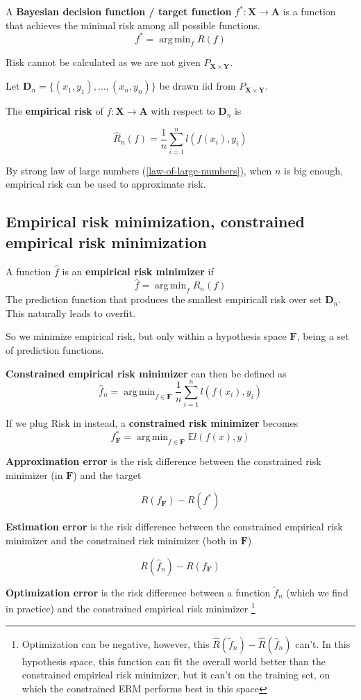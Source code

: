 \documentclass{article}
\DeclareMathOperator*{\argmin}{arg\,min}
\begin{document}
A \textbf{Bayesian decision function / target function} $f^* : \mathbf{X} \to \mathbf{A}$ is a function that achieves the minimal risk among all possible functions.
$$
f^* = \argmin_{f}{R(f)}
$$

Risk cannot be calculated as we are not given $P_{\mathbf{X} \times \mathbf{Y}}$.

Let $\mathbf{D}_n = \{(x_1, y_1), \dots, (x_n, y_n)\}$ be drawn iid from $P_{\mathbf{X} \times \mathbf{Y}}$.

The \textbf{empirical risk} of $f : \mathbf{X} \to \mathbf{A}$ with respect to $\mathbf{D}_n$ is

$$
\hat{R}_n(f) = \frac{1}{n} \sum_{i = 1}^{n}{\mathit{l}(f(x_i), y_i)}
$$

By strong law of large numbers (\ref{law-of-large-numbers}), when $n$ is big enough, empirical risk can be used to approximate risk.

\subsection{Empirical risk minimization, constrained empirical risk minimization}

A function $\hat{f}$ is an \textbf{empirical risk minimizer} if
$$
\hat{f} = \argmin_{f}{\hat{R}_n(f)}
$$
The prediction function that produces the smallest empiricall risk over set $\mathbf{D}_n$.
This naturally leads to overfit.

So we minimize empirical risk, but only within a hypothesis space $\mathbf{F}$, being a set of prediction functions.

\textbf{Constrained empirical risk minimizer} can then be defined as
$$
\hat{f}_n = \argmin_{f \in \mathbf{F}}{\frac{1}{n} \sum_{i = 1}^{n}{\mathit{l}(f(x_i), y_i)}}
$$

If we plug Risk in instead, a \textbf{constrained risk minimizer} becomes
$$
f^*_{\mathbf{F}} = \argmin_{f \in \mathbf{F}}{\mathbb{E}\mathit{l}(f(x), y)}
$$

\textbf{Approximation error} is the risk difference between the constrained risk minimizer (in $\mathbf{F}$) and the target

$$
R(f_{\mathbf{F}}) - R(f^*)
$$

\textbf{Estimation error} is the risk difference between the constrained empirical risk minimizer and the constrained risk minimizer (both in $\mathbf{F}$)

$$
R(\hat{f}_n) - R(f_{\mathbf{F}})
$$

\textbf{Optimization error} is the risk difference between a function $\tilde{f}_n$ (which we find in practice) and the constrained empirical risk minimizer
\footnote{Optimization can be negative, however, this $\hat{R}(\tilde{f}_n) - \hat{R}(\hat{f}_n)$ can't.
In this hypothesis space, this function can fit the overall world better than the constrained empirical risk minimizer, but it can't on the training set, on which the constrained ERM performs best in this space}
\end{document}
